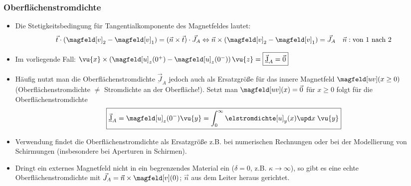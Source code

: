 \begin{frame}
  \frametitle{Oberflächenstromdichte}
  \begin{itemize}[<+->]
  \item Die Stetigkeitsbedingung für Tangentialkomponente des Magnetfeldes lautet:
    $$
    \vec{t}\cdot (\magfeld[v]_2 - \magfeld[v]_1) = (\vec{n} \times \vec{t})\cdot \vec{J}_A \Leftrightarrow \vec{n}\times (\magfeld[v]_2 - \magfeld[v]_1) = \vec{J}_A \quad \vec{n}: \text{von 1 nach 2}
    $$
  \item Im vorliegende Fall: $
    \vu{x} \times \left(\magfeld[u]_z(0^+) - \magfeld[u]_z(0^-)  \right) \vu{z} = \boxed{\vec{\underbar{J}}_A = \vec{0}} 
    $
  \item Häufig nutzt man die \alert{Oberflächenstromdichte} $\vec{\underbar{J}}_A$ jedoch auch als \alert{Ersatzgröße} für das innere Magnetfeld $\magfeld[uv](x\ge 0)$ (Oberflächenstromdichte $\ne$ Stromdichte an der Oberfläche!). Setzt man $\magfeld[uv](x) = \vec{0}$ für $x\ge 0$ folgt für die Oberflächenstromdichte
    $$
    \boxed{\vec{\underbar{J}}_A =\magfeld[u]_z(0^-) \vu{y} = \int_0^\infty \elstromdichte[u]_y(x) \upd x \; \vu{y}}
    $$
\item Verwendung findet die Oberflächenstromdichte als Ersatzgröße z.B. bei numerischen Rechnungen oder bei der Modellierung von Schirmungen (insbesondere bei Aperturen in Schirmen).
\item Dringt ein externes Magnetfeld nicht in ein begrenzendes Material ein ($\delta=0$, z.B. $\kappa \to \infty$), so gibt es eine \alert{echte} Oberflächenstromdichte mit $\vec{J}_A = \vec{n} \times \magfeld[v](0)$; $\vec{n}$ aus dem Leiter heraus gerichtet.  
\end{itemize}
\end{frame}


